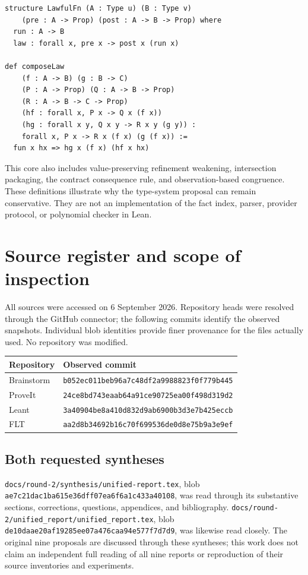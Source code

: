 \documentclass[11pt,a4paper]{article}
\newcommand{\code}[1]{\nolinkurl{#1}}
\theoremstyle{plain}
\theoremstyle{definition}
\theoremstyle{remark}
\begin{document}
\par\noindent\begin{minipage}{\linewidth}
\begin{lstlisting}
structure LawfulFn (A : Type u) (B : Type v)
    (pre : A -> Prop) (post : A -> B -> Prop) where
  run : A -> B
  law : forall x, pre x -> post x (run x)

def composeLaw
    (f : A -> B) (g : B -> C)
    (P : A -> Prop) (Q : A -> B -> Prop)
    (R : A -> B -> C -> Prop)
    (hf : forall x, P x -> Q x (f x))
    (hg : forall x y, Q x y -> R x y (g y)) :
    forall x, P x -> R x (f x) (g (f x)) :=
  fun x hx => hg x (f x) (hf x hx)
\end{lstlisting}
\end{minipage}\par

This core also includes value-preserving refinement weakening, intersection
packaging, the contract consequence rule, and observation-based congruence.
These definitions illustrate why the type-system proposal can remain
conservative. They are not an implementation of the fact index, parser,
provider protocol, or polynomial checker in Lean.

\section{Source register and scope of inspection}
\label{app:sources}
All sources were accessed on 6 September 2026. Repository heads were resolved
through the GitHub connector; the following commits identify the observed
snapshots. Individual blob identities provide finer provenance for the files
actually used. No repository was modified.

{\small
\begin{tabularx}{\textwidth}{@{}P{34mm}Y@{}}
\toprule
Repository & Observed commit\\
\midrule
Brainstorm & \code{b052ec011beb96a7c48df2a9988823f0f779b445}\\
ProveIt & \code{24ce8bd743eaab64a91ce90725ea00f498d319d2}\\
Leant & \code{3a40904be8a410d832d9ab6900b3d3e7b425eccb}\\
FLT & \code{aa2d8b34692b16c70f699536de0d8e75b9a3e9ef}\\
\bottomrule
\end{tabularx}}

\subsection{Both requested syntheses}
\code{docs/round-2/synthesis/unified-report.tex}, blob
\code{ae7c21dac1ba615e36dff07ea6f6a1c433a40108}, was read through its
substantive sections, corrections, questions, appendices, and bibliography.
\code{docs/round-2/unified_report/unified_report.tex}, blob
\code{de10daae20af19285ee07a476caa94e577f7d7d9}, was likewise read closely.
The original nine proposals are discussed through these syntheses; this work
does not claim an independent full reading of all nine reports or reproduction
of their source inventories and experiments.
\end{document}
